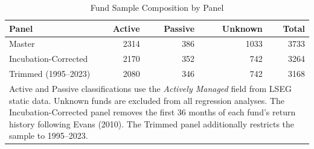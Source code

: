 \begin{table}[!h]
\centering
\caption{\label{tab:fund_counts}Fund Sample Composition by Panel}
\centering
\begin{tabular}[t]{lrrrr}
\toprule
Panel & Active & Passive & Unknown & Total\\
\midrule
Master & 2314 & 386 & 1033 & 3733\\
Incubation-Corrected & 2170 & 352 & 742 & 3264\\
Trimmed (1995--2023) & 2080 & 346 & 742 & 3168\\
\bottomrule
\multicolumn{5}{l}{\rule{0pt}{1em}Active and Passive classifications use the \textit{Actively Managed} field from LSEG static data. Unknown funds are excluded from all regression analyses. The Incubation-Corrected panel removes the first 36 months of each fund's return history following Evans (2010). The Trimmed panel additionally restricts the sample to 1995--2023.}\\
\end{tabular}
\end{table}
